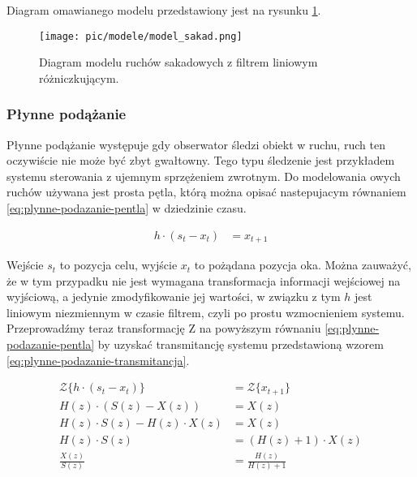 \documentclass[a4paper,twoside,12pt]{book}
\begin{document}
Diagram omawianego modelu przedstawiony jest na rysunku \ref{fig:model-sakad}.

\begin{figure}[h]
	\centering
	\texttt{[image: pic/modele/model\_sakad.png]}
	\caption{Diagram modelu ruchów sakadowych z filtrem liniowym różniczkującym.}
	\label{fig:model-sakad}
\end{figure}

\subsubsection{Płynne podążanie}
\label{subsubsec:plynne-podazanie}

Płynne podążanie występuje gdy obserwator śledzi obiekt w ruchu, ruch ten oczywiście nie może być zbyt gwałtowny. Tego typu śledzenie jest przykładem systemu sterowania z ujemnym sprzężeniem zwrotnym. Do modelowania owych ruchów używana jest prosta pętla, którą można opisać nastepujacym równaniem \ref{eq:plynne-podazanie-pentla} w dziedzinie czasu.

\begin{align}
	h \cdot (s_t - x_t) &= x_{t+1} 
	\label{eq:plynne-podazanie-pentla}
\end{align}

Wejście $s_t$ to pozycja celu, wyjście $x_t$ to pożądana pozycja oka. Można zauważyć, że w tym przypadku nie jest wymagana transformacja informacji wejściowej na wyjściową, a jedynie zmodyfikowanie jej wartości, w związku z tym $h$ jest liniowym niezmiennym w czasie filtrem, czyli po prostu wzmocnieniem systemu. Przeprowadźmy teraz transformację Z na powyższym równaniu \ref{eq:plynne-podazanie-pentla} by uzyskać transmitancję systemu przedstawioną wzorem \ref{eq:plynne-podazanie-transmitancja}.

\begin{align} %
	\mathcal{Z}\{h \cdot (s_t - x_t)\} &= \mathcal{Z}\{x_{t+1}\} \nonumber \\
	H(z) \cdot (S(z) - X(z)) &=  X(z) \nonumber \\ %
	H(z) \cdot S(z) - H(z) \cdot X(z) &=  X(z) \nonumber \\
	H(z) \cdot S(z) &= (H(z) + 1) \cdot X(z) \nonumber \\
	\frac{X(z)}{S(z)} &= \frac{H(z)}{H(z) + 1} \label{eq:plynne-podazanie-transmitancja}
\end{align}   %
\end{document}
